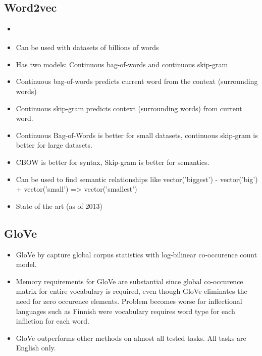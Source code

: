 \documentclass[12pt,a4paper,english
]{tutthesis}
\begin{document}
\subsection{Word2vec}
\begin{itemize}
\item \cite{Mikolov2013}
\item Can be used with datasets of billions of words
\item Has two models: Continuous bag-of-words and continuous skip-gram
\item Continuous bag-of-words predicts current word from the context (surrounding words)
\item Continuous skip-gram predicts context (surrounding words) from current word.
\item Continuous Bag-of-Words is better for small datasets, continuous skip-gram is better for large datasets.
\item CBOW is better for syntax, Skip-gram is better for semantics.
\item Can be used to find semantic relationships like vector('biggest') - vector('big') + vector('small') => vector('smallest') 
\item State of the art (as of 2013)
\end{itemize}

\subsection{GloVe}
\begin{itemize}
\item GloVe by \cite{Pennington2014} capture global corpus statistics with log-bilinear co-occurence count model.
\item Memory requirements for GloVe are substantial since global co-occurence matrix for entire vocabulary is required, even though GloVe eliminates the need for zero occurence elements. Problem becomes worse for inflectional languages such as Finnish were vocabulary requires word type for each infliction for each word.
\item GloVe outperforms other methods on almost all tested tasks. All tasks are English only. \cite{Pennington2014}
\end{itemize}
\end{document}

